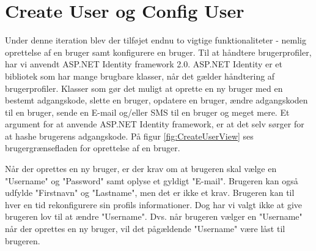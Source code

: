 \section{Create User og Config User}

Under denne iteration blev der tilføjet endnu to vigtige funktionaliteter - nemlig oprettelse af en bruger samt konfigurere en bruger. Til at håndtere brugerprofiler, har vi anvendt ASP.NET Identity framework 2.0. ASP.NET Identity er et bibliotek som har mange brugbare klasser, når det gælder håndtering af brugerprofiler. Klasser som gør det muligt at oprette en ny bruger med en bestemt adgangskode, slette en bruger, opdatere en bruger, ændre adgangskoden til en bruger, sende en E-mail og/eller SMS til en bruger og meget mere. Et argument for at anvende ASP.NET Identity framework, er at det selv sørger for at hashe brugerens adgangskode. 
På figur \ref{fig:CreateUserView} ses brugergrænsefladen for oprettelse af en bruger.


Når der oprettes en ny bruger, er der krav om at brugeren skal vælge en "Username" og "Password" samt oplyse et gyldigt "E-mail". Brugeren kan også udfylde "Firstnavn" og "Lastname", men det er ikke et krav. Brugeren kan til hver en tid rekonfigurere sin profils informationer. Dog har vi valgt ikke at give brugeren lov til at ændre "Username". Dvs. når brugeren vælger en "Username" når der oprettes en ny bruger, vil det pågældende "Username" være låst til brugeren. 
